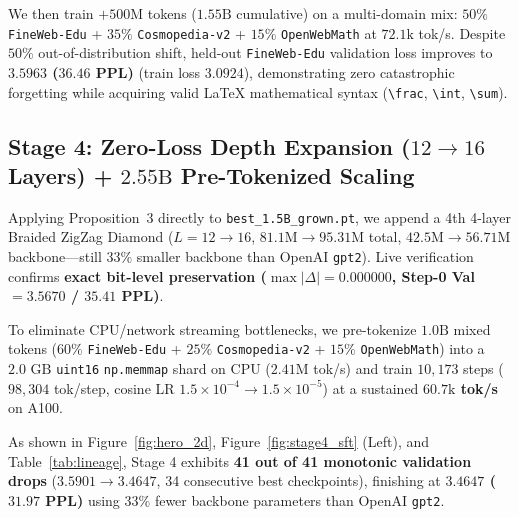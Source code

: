 \documentclass[10pt,twocolumn]{article}
\newcommand{\citep}[1]{\cite{#1}}
\begin{document}
We then train $+500\text{M}$ tokens ($1.55\text{B}$ cumulative) on a multi-domain mix: $50\%$ \texttt{FineWeb-Edu} + $35\%$ \texttt{Cosmopedia-v2} \citep{allal2025smollm2} + $15\%$ \texttt{OpenWebMath} \citep{paster2023openwebmath} at $72.1\text{k}$ tok/s. Despite $50\%$ out-of-distribution shift, held-out \texttt{FineWeb-Edu} validation loss improves to \textbf{$3.5963$ ($36.46$ PPL)} (train loss $3.0924$), demonstrating zero catastrophic forgetting while acquiring valid \LaTeX{} mathematical syntax (\texttt{\textbackslash frac}, \texttt{\textbackslash int}, \texttt{\textbackslash sum}).

\subsection{Stage 4: Zero-Loss Depth Expansion ($12 \to 16$ Layers) + $2.55\text{B}$ Pre-Tokenized Scaling}
Applying Proposition~3 directly to \texttt{best\_1.5B\_grown.pt}, we append a 4th 4-layer Braided ZigZag Diamond ($L=12 \to 16$, $81.1\text{M} \to 95.31\text{M}$ total, $42.5\text{M} \to 56.71\text{M}$ backbone---still $33\%$ smaller backbone than OpenAI \texttt{gpt2}). Live verification confirms \textbf{exact bit-level preservation ($\max|\Delta| = 0.000000$, Step-0 Val $= 3.5670$ / $35.41$ PPL)}.

To eliminate CPU/network streaming bottlenecks, we pre-tokenize $1.0\text{B}$ mixed tokens ($60\%$ \texttt{FineWeb-Edu} + $25\%$ \texttt{Cosmopedia-v2} + $15\%$ \texttt{OpenWebMath}) into a $2.0\text{ GB}$ \texttt{uint16} \texttt{np.memmap} shard on CPU ($2.41\text{M}$ tok/s) and train $10{,}173$ steps ($98{,}304$ tok/step, cosine LR $1.5{\times}10^{-4} \to 1.5{\times}10^{-5}$) at a sustained \textbf{$60.7\text{k}$ tok/s} on A100.

As shown in Figure~\ref{fig:hero_2d}, Figure~\ref{fig:stage4_sft} (Left), and Table~\ref{tab:lineage}, Stage 4 exhibits \textbf{41 out of 41 monotonic validation drops} ($3.5901 \to 3.4647$, 34 consecutive best checkpoints), finishing at \textbf{$3.4647$ ($31.97$ PPL)} using $33\%$ fewer backbone parameters than OpenAI \texttt{gpt2}.
\end{document}
